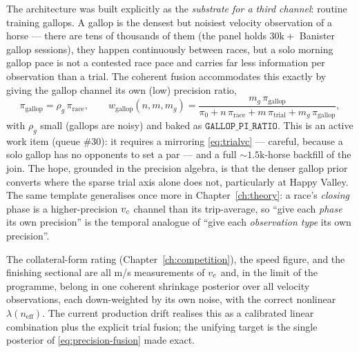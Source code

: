The architecture was built explicitly as the \emph{substrate for a third channel}: routine
training gallops. A gallop is the densest but noisiest velocity observation of a horse --- there
are tens of thousands of them (the  panel holds $30\text{k}+$ Banister
gallop sessions), they happen continuously between races, but a solo morning gallop pace is not a
contested race pace and carries far less information per observation than a trial. The coherent
fusion accommodates this exactly by giving the gallop channel its own (low) precision ratio,
\begin{equation}
  \pi_{\text{gallop}} = \rho_g\,\pi_{\text{race}},\qquad
  w_{\text{gallop}}(n,m,m_g)
   = \frac{m_g\,\pi_{\text{gallop}}}
          {\pi_0 + n\,\pi_{\text{race}} + m\,\pi_{\text{trial}} + m_g\,\pi_{\text{gallop}}},
  \label{eq:gallopfusion}
\end{equation}
with $\rho_g$ small (gallops are noisy) and baked as $\texttt{GALLOP\_PI\_RATIO}$. This is an
active work item (queue \#30): it requires a  mirroring
\eqref{eq:trialvc} --- careful, because a solo gallop has no opponents to set a par --- and a full
$\sim\!1.5\text{k}$-horse backfill of the join. The hope, grounded in the precision algebra, is
that the denser gallop prior converts where the sparse trial axis alone does not, particularly at
Happy Valley. The same template generalises once more in Chapter~\ref{ch:theory}: a race's
\emph{closing} phase is a higher-precision ${v_{c}}$ channel than its trip-average, so ``give each
\emph{phase} its own precision'' is the temporal analogue of ``give each \emph{observation type}
its own precision''.

\begin{remark}
The collateral-form rating (Chapter~\ref{ch:competition}), the speed figure, and the finishing
sectional are all m/s measurements of ${v_{c}}$ and, in the limit of the programme, belong in one
coherent shrinkage posterior over all velocity observations, each down-weighted by its own noise,
with the correct nonlinear $\lambda(n_{\text{eff}})$. The current production drift realises this as
a calibrated linear combination plus the explicit trial fusion; the unifying target is the single
posterior of \eqref{eq:precision-fusion} made exact.
\end{remark}
